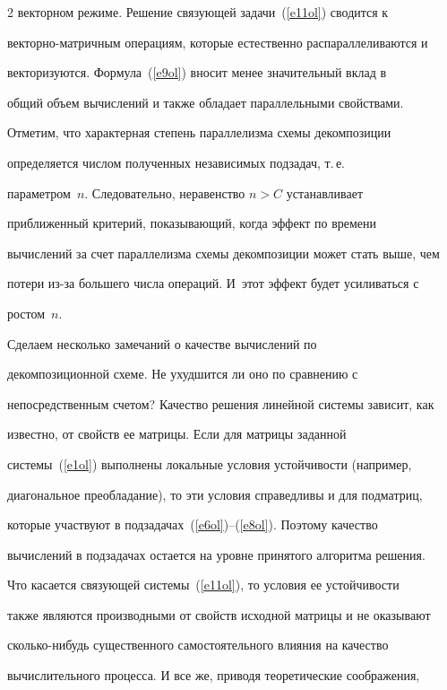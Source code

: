\begin{multicols}{2}
векторном режиме. Решение связующей задачи~(\ref{e11ol}) сводится к


векторно-матричным операциям, которые естественно распараллеливаются и


векторизуются. Формула~(\ref{e9ol}) вносит менее значительный вклад в


общий объем вычислений и также обладает параллельными свойствами.





     Отметим, что характерная степень параллелизма схемы декомпозиции


определяется числом полученных независимых подзадач, т.\,е.\


па\-ра\-мет\-ром~$n$. Следовательно, неравенство $n > C$ устанав\-ли\-ва\-ет


приближенный критерий, показывающий, когда эффект по времени


вычислений за счет параллелизма схемы декомпозиции может стать выше, чем


потери из-за большего числа операций. И~этот эффект будет усиливаться с


ростом~$n$.





     Сделаем несколько замечаний о качестве вы\-чис\-ле\-ний по


декомпозиционной схеме. Не ухудшится ли оно по сравнению с


непосредственным счетом? Качество решения линейной системы зависит, как


известно, от свойств ее матрицы. Если для матрицы заданной


системы~(\ref{e1ol}) выполнены локальные условия устойчивости (например,


диагональное преобладание), то эти условия справедливы и для под\-мат\-риц,


которые участвуют в подзадачах~(\ref{e6ol})--(\ref{e8ol}). Поэтому качество


вычислений в подзадачах остается на уровне принятого алгоритма решения.


Что касается связующей системы~(\ref{e11ol}), то условия ее устойчивости


также являются производными от свойств исходной матрицы и не оказывают


сколько-нибудь существенного самостоятельного влияния на качество


вычислительного процесса. И все же, приводя теоретические соображения,



\end{multicols}

